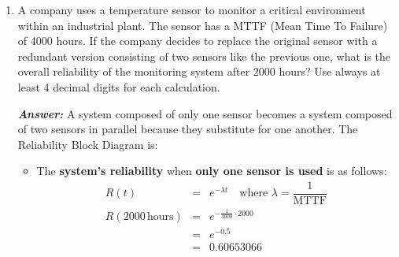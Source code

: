\begin{enumerate}
    \newpage

    \item A company uses a temperature sensor to monitor a critical environment within an industrial plant. The sensor has a MTTF (Mean Time To Failure) of 4000 hours. If the company decides to replace the original sensor with a redundant version consisting of two sensors like the previous one, what is the overall reliability of the monitoring system after 2000 hours? Use always at least 4 decimal digits for each calculation.

    \textcolor{Green3}{\textbf{\emph{Answer:}}} A system composed of only one sensor becomes a system composed of two sensors in parallel because they substitute for one another. The Reliability Block Diagram is:
    \begin{center}
    \end{center}
    \begin{itemize}
        \item The \textbf{system's reliability} when \textbf{only one sensor is used} is as follows:
        \begin{equation*}
            \begin{array}{rcl}
                R\left(t\right) &=& e^{-\lambda t} \quad \text{where }\lambda = \dfrac{1}{\text{MTTF}} \\ [1.3em]
                R\left(2000\, \text{hours}\right) &=& e^{-\frac{1}{4000} \cdot 2000} \\ [1em]
                &=& e^{-0.5} \\ [1em]
                &=& 0.60653066
            \end{array}
        \end{equation*}


\end{itemize}
\end{enumerate}
